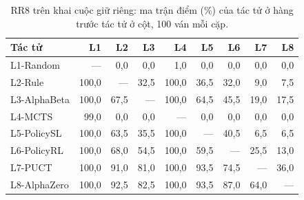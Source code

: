 \begin{table}[H]
  \centering\footnotesize
  \caption{RR8 trên khai cuộc giữ riêng: ma trận điểm (\%) của tác tử ở hàng trước tác tử ở cột, 100 ván mỗi cặp.}
  \label{tab:rr8-giu-rieng-matran}
  \setlength{\tabcolsep}{4pt}
  \begin{tabular}{@{}lrrrrrrrr@{}}
    \toprule
    Tác tử & L1 & L2 & L3 & L4 & L5 & L6 & L7 & L8 \\
    \midrule
    L1-Random & --- & 0{,}0 & 0{,}0 & 1{,}0 & 0{,}0 & 0{,}0 & 0{,}0 & 0{,}0 \\
    L2-Rule & 100{,}0 & --- & 32{,}5 & 100{,}0 & 36{,}5 & 32{,}0 & 9{,}0 & 7{,}5 \\
    L3-AlphaBeta & 100{,}0 & 67{,}5 & --- & 100{,}0 & 64{,}5 & 45{,}5 & 19{,}0 & 17{,}5 \\
    L4-MCTS & 99{,}0 & 0{,}0 & 0{,}0 & --- & 0{,}0 & 0{,}0 & 0{,}0 & 0{,}0 \\
    L5-PolicySL & 100{,}0 & 63{,}5 & 35{,}5 & 100{,}0 & --- & 40{,}5 & 6{,}5 & 6{,}5 \\
    L6-PolicyRL & 100{,}0 & 68{,}0 & 54{,}5 & 100{,}0 & 59{,}5 & --- & 25{,}5 & 13{,}0 \\
    L7-PUCT & 100{,}0 & 91{,}0 & 81{,}0 & 100{,}0 & 93{,}5 & 74{,}5 & --- & 36{,}0 \\
    L8-AlphaZero & 100{,}0 & 92{,}5 & 82{,}5 & 100{,}0 & 93{,}5 & 87{,}0 & 64{,}0 & --- \\
    \bottomrule
  \end{tabular}
\end{table}
